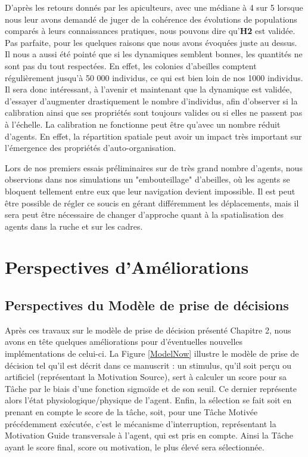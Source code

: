 		 D'après les retours donnés par les apiculteurs, avec une médiane à 4 sur 5 lorsque nous leur avons demandé de juger de la cohérence des évolutions de populations comparés à leurs connaissances pratiques, nous pouvons dire qu'\textbf{H2} est validée. Pas parfaite, pour les quelques raisons que nous avons évoquées juste au dessus. Il nous a aussi été pointé que si les dynamiques semblent bonnes, les quantités ne sont pas du tout respectées. En effet, les colonies d'abeilles comptent régulièrement jusqu'à 50 000 individus, ce qui est bien loin de nos 1000 individus. Il sera donc intéressant, à l'avenir et maintenant que la dynamique est validée, d'essayer d'augmenter drastiquement le nombre d'individus, afin d'observer si la calibration ainsi que ses propriétés sont toujours valides ou si elles ne passent pas à l'échelle. La calibration ne fonctionne peut être qu'avec un nombre réduit d'agents. En effet, la répartition spatiale peut avoir un impact très important sur l'émergence des propriétés d'auto-organisation.
		 
		 Lors de nos premiers essais préliminaires sur de très grand nombre d'agents, nous observions dans nos simulations un "embouteillage" d'abeilles, où les agents se bloquent tellement entre eux que leur navigation devient impossible. Il est peut être possible de régler ce soucis en gérant différemment les déplacements, mais il sera peut être nécessaire de changer d'approche quant à la spatialisation des agents dans la ruche et sur les cadres.
	
	
	\section{Perspectives d'Améliorations}
	\label{sectionPerspectivesSMA}
	
	\subsection{Perspectives du Modèle de prise de décisions}
	Après ces travaux sur le modèle de prise de décision présenté Chapitre 2, nous avons en tête quelques améliorations pour d'éventuelles nouvelles implémentations de celui-ci. La Figure \ref{ModelNow} illustre le modèle de prise de décision tel qu'il est décrit dans ce manuscrit : un stimulus, qu'il soit perçu ou artificiel (représentant la Motivation Source), sert à calculer un score pour sa Tâche par le biais d'une fonction sigmoïde et de son seuil. Ce dernier représente alors l'état physiologique/physique de l'agent. Enfin, la sélection se fait soit en prenant en compte le score de la tâche, soit, pour une Tâche Motivée précédemment exécutée, c'est le mécanisme d'interruption, représentant la Motivation Guide transversale à l'agent, qui est pris en compte. Ainsi la Tâche ayant le score final, score ou motivation, le plus élevé sera sélectionnée.
	
